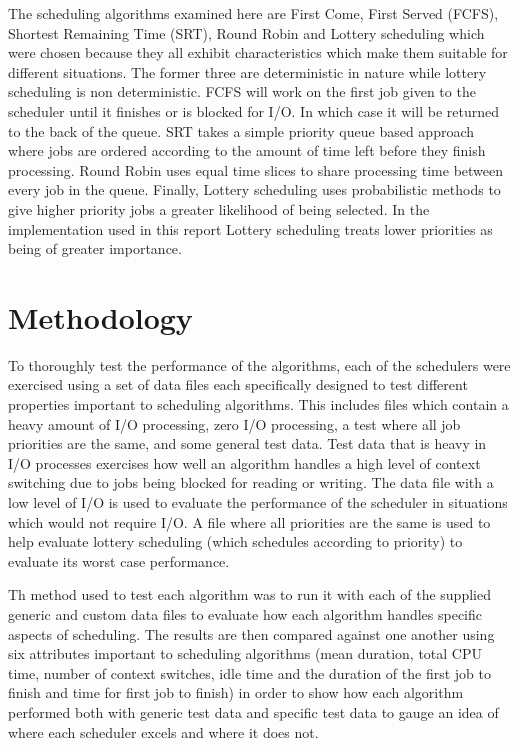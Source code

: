 \documentclass{acm_proc_article-sp}
\begin{document}
The scheduling algorithms examined here are First Come, First Served (FCFS)\cite{donaldson:scheduling}\cite{ozdogan:scheduling}, Shortest Remaining Time (SRT)\cite{donaldson:scheduling}\cite{ozdogan:scheduling}, Round Robin\cite{donaldson:scheduling}\cite{ozdogan:scheduling} and Lottery scheduling\cite{petrou:lottery} which were chosen because they all exhibit characteristics which make them suitable for different situations. The former three are deterministic in nature while lottery scheduling is non deterministic. FCFS will work on the first job given to the scheduler until it finishes or is blocked for I/O. In which case it will be returned to the back of the queue. SRT takes a simple priority queue based approach where jobs are ordered according to the amount of time left before they finish processing. Round Robin uses equal time slices to share processing time between every job in the queue. Finally, Lottery scheduling uses probabilistic methods to give higher priority jobs a greater likelihood of being selected. In the implementation used in this report Lottery scheduling treats lower priorities as being of greater importance.

\section{Methodology} 
\label{methodology}
To thoroughly test the performance of the algorithms, each of the schedulers were exercised using a set of data files each specifically designed to test different properties important to scheduling algorithms. This includes files which contain a heavy amount of I/O processing, zero I/O processing, a test where all job priorities are the same, and some general test data. Test data that is heavy in I/O processes exercises how well an algorithm handles a high level of context switching due to jobs being blocked for reading or writing. The data file with a low level of I/O is used to evaluate the performance of the scheduler in situations which would not require I/O. A file where all priorities are the same is used to help evaluate lottery scheduling (which schedules according to priority) to evaluate its worst case performance.

Th method used to test each algorithm was to run it with each of the supplied generic and custom data files to evaluate how each algorithm handles specific aspects of scheduling. The results are then compared against one another using six attributes important to scheduling algorithms (mean duration, total CPU time, number of context switches, idle time and the duration of the first job to finish and time for first job to finish) in order to show how each algorithm performed both with generic test data and specific test data to gauge an idea of where each scheduler excels and where it does not.
\end{document}
